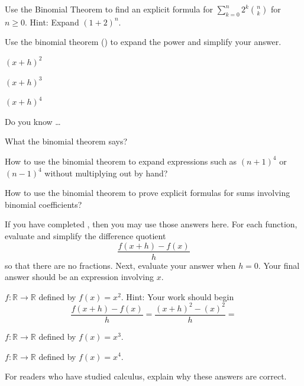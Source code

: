 \begin{exer}[\exerU] %
\label{exer_bin_thm_find_row_sum}
    Use the Binomial Theorem to find an explicit formula for  $\displaystyle \sum_{k=0}^n 2^k\binom{n}{k}$ for $n \ge 0$.  Hint:  Expand $(1+2)^n$.    
\end{exer}

\begin{exer}[\exerU] %
\label{exer_binom_thm_xplush}
    Use the binomial theorem () to expand the power and simplify your answer.
    \begin{exerpart}
        \item $(x+h)^2$
        \item $(x+h)^3$
        \item $(x+h)^4$
    \end{exerpart}
\end{exer}

\begin{exer}[\exerR] %
\label{exer_dyk_binom_thm}
    Do you know \ldots
        \begin{exerpart}
            \item What the binomial theorem says?
            \item How to use the binomial theorem to expand expressions such as $(n+1)^4$ or $(n-1)^4$ without multiplying out by hand?
            \item How to use the binomial theorem to prove explicit formulas for sums involving binomial coefficients? 
        \end{exerpart}
\end{exer}

\begin{exer}[\exerE] %
\label{exer_diff_quo}
    If you have completed , then you may use those answers here.  For each function, evaluate and simplify the difference quotient 
        $$\frac{f(x+h)-f(x)}{h}$$
    so that there are no fractions. 
    Next, evaluate your answer when $h=0$.  Your final answer should be an expression involving $x$. 
        \begin{exerpart}
            \item $f: \mathbb{R} \to \mathbb{R}$ defined by $f(x) = x^2$.  \quad Hint:  Your work should begin $$\frac{f(x+h)-f(x)}{h}=\frac{(x+h)^2-(x)^2}{h}=$$
            \item $f: \mathbb{R} \to \mathbb{R}$ defined by $f(x) = x^3$.
            \item $f: \mathbb{R} \to \mathbb{R}$ defined by $f(x) = x^4$.
            \item For readers who have studied calculus, explain why these answers are correct.
    \end{exerpart}
\end{exer}

